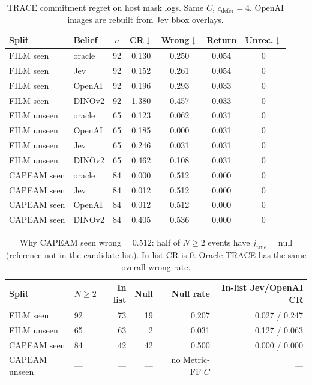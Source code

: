 \documentclass[11pt]{article}
\begin{document}
\begin{table}[t]
\centering
\caption{TRACE commitment regret on host mask logs. Same $C$, $c_{\mathrm{defer}}{=}4$. OpenAI images are rebuilt from Jev bbox overlays.}
\label{tab:replay-trace}
\scriptsize
\begin{tabular}{llccccc}
\toprule
Split & Belief & $n$ & CR$\downarrow$ & Wrong$\downarrow$ & Return & Unrec.$\downarrow$ \\
\midrule
FILM seen & oracle & 92 & 0.130 & 0.250 & 0.054 & 0 \\
FILM seen & Jev & 92 & 0.152 & 0.261 & 0.054 & 0 \\
FILM seen & OpenAI & 92 & 0.196 & 0.293 & 0.033 & 0 \\
FILM seen & DINOv2 & 92 & 1.380 & 0.457 & 0.033 & 0 \\
\midrule
FILM unseen & oracle & 65 & 0.123 & 0.062 & 0.031 & 0 \\
FILM unseen & OpenAI & 65 & 0.185 & 0.000 & 0.031 & 0 \\
FILM unseen & Jev & 65 & 0.246 & 0.031 & 0.031 & 0 \\
FILM unseen & DINOv2 & 65 & 0.462 & 0.108 & 0.031 & 0 \\
\midrule
CAPEAM seen & oracle & 84 & 0.000 & 0.512 & 0.000 & 0 \\
CAPEAM seen & Jev & 84 & 0.012 & 0.512 & 0.000 & 0 \\
CAPEAM seen & OpenAI & 84 & 0.012 & 0.512 & 0.000 & 0 \\
CAPEAM seen & DINOv2 & 84 & 0.405 & 0.536 & 0.000 & 0 \\
\bottomrule
\end{tabular}
\end{table}

\begin{table}[t]
\centering
\caption{Why CAPEAM seen wrong${=}0.512$: half of $N\ge 2$ events have $j_{\mathrm{true}}{=}\mathrm{null}$ (reference not in the candidate list). In-list CR is $0$. Oracle TRACE has the same overall wrong rate.}
\label{tab:replay-jtrue}
\scriptsize
\begin{tabular}{llrrrr}
\toprule
Split & $N\ge 2$ & In list & Null & Null rate & In-list Jev/OpenAI CR \\
\midrule
FILM seen & 92 & 73 & 19 & 0.207 & 0.027 / 0.247 \\
FILM unseen & 65 & 63 & 2 & 0.031 & 0.127 / 0.063 \\
CAPEAM seen & 84 & 42 & 42 & 0.500 & 0.000 / 0.000 \\
CAPEAM unseen & --- & --- & --- & no Metric-FF $C$ & --- \\
\bottomrule
\end{tabular}
\end{table}
\end{document}
